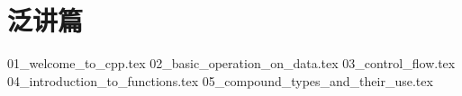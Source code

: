 \part*{泛讲篇}
{01_welcome_to_cpp.tex}
{02_basic_operation_on_data.tex}
{03_control_flow.tex}
{04_introduction_to_functions.tex}
{05_compound_types_and_their_use.tex}